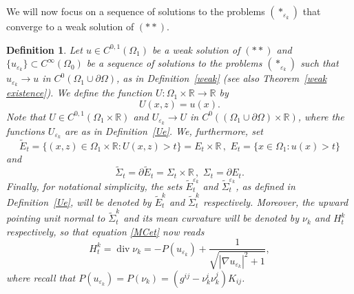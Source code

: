 \documentclass[11pt]{amsart}
\newtheorem{Definition}[Theorem]{Definition}
\renewcommand{\epsilon}{\varepsilon}
\DeclareMathOperator{\dvg}{div} \DeclareMathOperator{\spt}{spt}
\def\R{\mathbb{R}}
\def\e{\epsilon}
\def\wt{\widetilde}
\begin{document}
We will now focus on a sequence  of  solutions to the problems $(*_{\varepsilon_k})$   that converge to a weak solution of  $(**)$.
\begin {Definition}\label{U} Let $u\in C^{0,1}(\Omega_1)$ be a weak solution of $(**)$ and  $\{u_{\e_k}\}\subset C^\infty(\Omega_0)$ be a sequence of solutions to the problems $(*_{\varepsilon_k})$ such that
$ u_{\varepsilon_k}\to u$  in $C^0({\Omega_1}\cup\partial\Omega)$,
as in Definition~\ref{weak} (see also Theorem~\ref{weak existence}). We define the function $U:\Omega_1\times\R\to\R$ by
\[U(x,z)=u(x).\]
Note that $U\in C^{0,1}(\Omega_1\times\R)$ and $U_{\e_k}\to U$ in $C^0(({\Omega_1}\cup\partial\Omega)\times\R)$, where the functions  $U_{\e_k}$ are as in Definition~\ref{Ue}. We, 
furthermore, set 
\[\wt E_t=\{(x,z)\in \Omega_1\times\R: U(x,z)>t\}= E_t\times\R\,,\,\,E_t=\{x\in \Omega_1:u(x)>t\}\]
and
\[\wt\Sigma_t=\partial \wt E_t=\Sigma_t\times\R\,,\,\,\Sigma_t=\partial E_t.\]
Finally,  for notational simplicity, the sets $\wt E_t^{\e_k}$ and $\wt\Sigma_t^{\e_k}$, as defined in Definition~\ref{Ue}, will be denoted by $\wt E_t^k$ and $\wt\Sigma_t^k$ respectively. Moreover, the upward pointing unit normal to $\wt\Sigma _t^k$ and its mean curvature will be denoted by $\nu_k$ and $H_t^k$ respectively, so that equation \eqref{MCet} now reads
\begin{equation}\label{MCet2}
H_t^k=\dvg\nu_k=-P(u_{\e_k})+\frac{1}{\sqrt{|\nabla u_{\e_k}|^2+1}},
\end{equation}
where recall that $P(u_{\e_k})=P(\nu_k)=(g^{ij}-\nu_k^i\nu_k^j)K_{ij}$.
\end{Definition}
 
\end{document}
